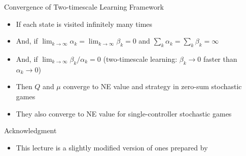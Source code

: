\documentclass[11pt,aspectratio=169,handout]{beamer}
\begin{document}
  
  \begin{frame}{Convergence of Two-timescale Learning Framework}
   \begin{itemize}
   \setlength{\itemsep}{1em}
    \item If each state is visited \alert{infinitely} many times
    \item And, if $\lim_{k\to \infty} \alpha_k = \lim_{k\to \infty} \beta_k = 0$ and $\sum_k \alpha_k = \sum_k \beta_k = \infty$
    \item And, if $\lim_{k\to \infty} \beta_k / \alpha_k = 0$ (two-timescale learning: $\beta_k \to 0$ faster than $\alpha_k \to 0$)
    \item Then $Q$ and $\mu$ converge to NE value and strategy in zero-sum stochastic games
    \item They also converge to NE value for single-controller stochastic games
   \end{itemize}
  \end{frame}
  

  \begin{frame}{Acknowledgment}
   \begin{itemize}
    \setlength{\itemsep}{1em}
    \item This lecture is a slightly modified version of ones prepared by
   \end{itemize}
  \end{frame}
  
  
\end{document}
